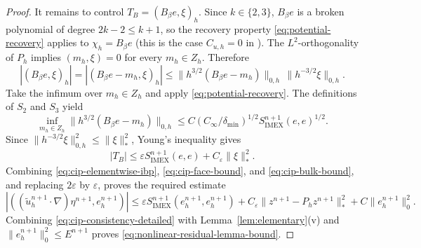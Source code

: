 \documentclass[11pt]{article}
\theoremstyle{remark}\newtheorem{remark}{Remark}
\newcommand{\tu}{\tilde u_h}
\newcommand{\Simex}{S_{\mathrm{IMEX}}}
\newcommand{\Ph}{P_h}
\newcommand{\eps}{\varepsilon}
\theoremstyle{plain}
\newcommand{\new}[1]{{\color{blue}#1}}
\begin{document}
\begin{proof}
It remains to control $T_B=(B_\beta e,\xi)_h$. \new{Since $k\in\{2,3\}$, $B_\beta e$ is a broken polynomial of degree $2k-2\le k+1$, so the recovery property \eqref{eq:potential-recovery} applies to $\chi_h=B_\beta e$ (this is the case $C_{u,h}=0$ in \cite[Lemma~3.6]{GAN25}).} The $L^2$-orthogonality of $\Ph$ implies $(m_h,\xi)=0$ for every $m_h\in Z_h$. Therefore
\[
|(B_\beta e,\xi)_h|=|(B_\beta e-m_h,\xi)_h|\le\|h^{3/2}(B_\beta e-m_h)\|_{0,h}\,\|h^{-3/2}\xi\|_{0,h}.
\]
Take the infimum over $m_h\in Z_h$ and apply \eqref{eq:potential-recovery}. The definitions of $S_2$ and $S_3$ yield
\begin{equation}\label{eq:bulk-recovery-bound}
\inf_{m_h\in Z_h}\|h^{3/2}(B_\beta e-m_h)\|_{0,h}
\le C(C_\infty/\delta_{\min})^{1/2}\Simex^{n+1}(e,e)^{1/2}.
\end{equation}
Since \new{$\|h^{-3/2}\xi\|_{0,h}^2\le\|\xi\|_*^2$}, Young's inequality gives
\begin{equation}\label{eq:cip-bulk-bound}
|T_B|\le\eps\Simex^{n+1}(e,e)+C_\eps\|\xi\|_*^2.
\end{equation}
Combining \eqref{eq:cip-elementwise-ibp},
\eqref{eq:cip-face-bound}, and \eqref{eq:cip-bulk-bound}, and replacing
$2\eps$ by $\eps$, proves the required estimate
\begin{equation}\label{eq:cip-consistency-detailed}
|((\tu^{n+1}\cdot\nabla)\eta^{n+1},e_h^{n+1})|
\le\eps\Simex^{n+1}(e_h^{n+1},e_h^{n+1})
+C_\eps\|z^{n+1}-\Ph z^{n+1}\|_*^2
+C\|e_h^{n+1}\|_0^2.
\end{equation}
Combining \eqref{eq:cip-consistency-detailed} with Lemma~\ref{lem:elementary}(v) and $\|e_h^{n+1}\|_0^2\le E^{n+1}$ proves \eqref{eq:nonlinear-residual-lemma-bound}.
\end{proof}

\end{document}
